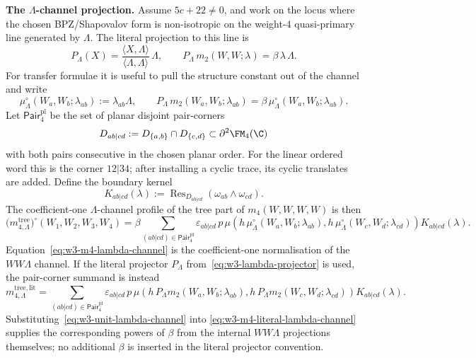 \medskip
\noindent\textbf{The \(\Lambda\)-channel projection.}
Assume \(5c+22\neq0\), and work on the locus where the chosen
BPZ/Shapovalov form is non-isotropic on the weight-\(4\)
quasi-primary line generated by \(\Lambda\).  The literal projection
to this line is
\begin{equation}
\label{eq:w3-lambda-projector}
	P_\Lambda(X)
	=
	\frac{\langle X,\Lambda\rangle}{\langle\Lambda,\Lambda\rangle}
	\,\Lambda,
	\qquad
	P_\Lambda\,m_2(W,W;\lambda)
	=
	\beta\,\lambda\,\Lambda.
\end{equation}
For transfer formulae it is useful to pull the structure constant
out of the channel and write
\begin{equation}
\label{eq:w3-unit-lambda-channel}
	\mu^\circ_\Lambda(W_a,W_b;\lambda_{ab})
	:=
	\lambda_{ab}\Lambda,
	\qquad
	P_\Lambda\,m_2(W_a,W_b;\lambda_{ab})
	=
	\beta\,\mu^\circ_\Lambda(W_a,W_b;\lambda_{ab}).
\end{equation}
Let \(\mathsf{Pair}^{\mathrm{pl}}_4\) be the set of planar disjoint
pair-corners
\[
	D_{ab|cd}:=D_{\{a,b\}}\cap D_{\{c,d\}}
	\subset \partial^2\FM_4(\C)
\]
with both pairs consecutive in the chosen planar order.  For the
linear ordered word this is the corner \(12|34\); after installing a
cyclic trace, its cyclic translates are added.  Define the boundary
kernel
\begin{equation}
\label{eq:w3-lambda-boundary-kernel}
	K_{ab|cd}(\lambda)
	:=
	\operatorname{Res}_{D_{ab|cd}}\!
	(\omega_{ab}\wedge\omega_{cd}).
\end{equation}
The coefficient-one \(\Lambda\)-channel profile of the tree part of
\(m_4(W,W,W,W)\) is then
\begin{equation}
\label{eq:w3-m4-lambda-channel}
\bigl(m_{4,\Lambda}^{\mathrm{tree}}\bigr)^\circ
(W_1,W_2,W_3,W_4)
=
\beta
\sum_{(ab|cd)\in\mathsf{Pair}^{\mathrm{pl}}_4}
\varepsilon_{ab|cd}\,
p\,\mu\!\left(
h\,\mu^\circ_\Lambda(W_a,W_b;\lambda_{ab}),
h\,\mu^\circ_\Lambda(W_c,W_d;\lambda_{cd})
\right)
K_{ab|cd}(\lambda).
\end{equation}
Equation~\eqref{eq:w3-m4-lambda-channel} is the coefficient-one
normalisation of the \(WW\Lambda\) channel.  If the literal projector
\(P_\Lambda\) from~\eqref{eq:w3-lambda-projector} is used, the
pair-corner summand is instead
\begin{equation}
\label{eq:w3-m4-literal-lambda-channel}
m_{4,\Lambda}^{\mathrm{tree,lit}}
=
\sum_{(ab|cd)\in\mathsf{Pair}^{\mathrm{pl}}_4}
\varepsilon_{ab|cd}\,
p\,\mu\!\left(
h\,P_\Lambda m_2(W_a,W_b;\lambda_{ab}),
h\,P_\Lambda m_2(W_c,W_d;\lambda_{cd})
\right)
K_{ab|cd}(\lambda).
\end{equation}
Substituting~\eqref{eq:w3-unit-lambda-channel} into
\eqref{eq:w3-m4-literal-lambda-channel} supplies the corresponding
powers of \(\beta\) from the internal \(WW\Lambda\) projections
themselves; no additional \(\beta\) is inserted in the literal
projector convention.

